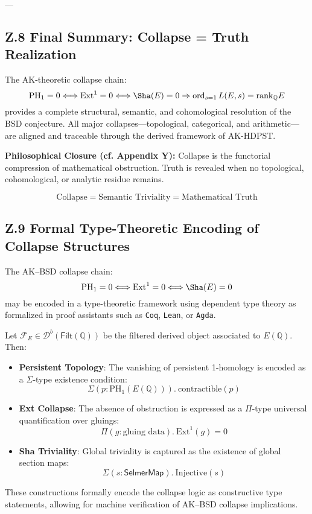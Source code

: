 ---

\subsection*{Z.8 Final Summary: Collapse = Truth Realization}

The AK-theoretic collapse chain:
\[
\mathrm{PH}_1 = 0 \Longleftrightarrow \mathrm{Ext}^1 = 0 \Longleftrightarrow \Sha(E) = 0 \Rightarrow \operatorname{ord}_{s=1} L(E,s) = \mathrm{rank}_\mathbb{Q} E
\]
provides a complete structural, semantic, and cohomological resolution of the BSD conjecture.  
All major collapses—topological, categorical, and arithmetic—are aligned and traceable through the derived framework of AK-HDPST.

\textbf{Philosophical Closure (cf. Appendix Y):}  
Collapse is the functorial compression of mathematical obstruction.  
Truth is revealed when no topological, cohomological, or analytic residue remains.

\[
\text{Collapse} = \text{Semantic Triviality} = \text{Mathematical Truth}
\]


\subsection*{Z.9 Formal Type-Theoretic Encoding of Collapse Structures}

The AK–BSD collapse chain:
\[
\mathrm{PH}_1 = 0 \Longleftrightarrow \mathrm{Ext}^1 = 0 \Longleftrightarrow \Sha(E) = 0
\]
may be encoded in a type-theoretic framework using dependent type theory as formalized in proof assistants such as \texttt{Coq}, \texttt{Lean}, or \texttt{Agda}.

\begin{definition}
Let \( \mathcal{F}_E \in \mathcal{D}^b(\mathsf{Filt}(\mathbb{Q})) \) be the filtered derived object associated to \( E(\mathbb{Q}) \). Then:

\begin{itemize}
  \item \textbf{Persistent Topology}:  
  The vanishing of persistent 1-homology is encoded as a $\Sigma$-type existence condition:
  \[
  \Sigma(p : \mathrm{PH}_1(E(\mathbb{Q}))).\ \text{contractible}(p)
  \]

  \item \textbf{Ext Collapse}:  
  The absence of obstruction is expressed as a $\Pi$-type universal quantification over gluings:
  \[
  \Pi(g : \text{gluing data}).\ \text{Ext}^1(g) = 0
  \]

  \item \textbf{Sha Triviality}:  
  Global triviality is captured as the existence of global section maps:
  \[
  \Sigma(s : \mathsf{SelmerMap}).\ \text{Injective}(s)
  \]
\end{itemize}

These constructions formally encode the collapse logic as constructive type statements, allowing for machine verification of AK–BSD collapse implications.
\end{definition}

